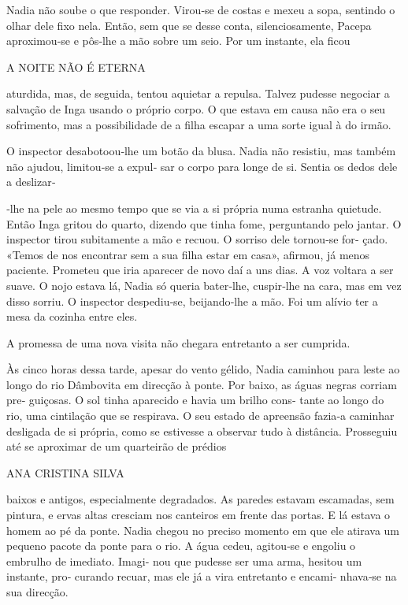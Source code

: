 Nadia não soube o que responder. Virou‑se de costas e mexeu a sopa,
sentindo o olhar dele fixo nela. Então, sem que se desse conta,
silenciosamente, Pacepa aproximou‑se e pôs‑lhe a mão sobre um seio. Por
um instante, ela ficou

A NOITE NÃO É ETERNA

aturdida, mas, de seguida, tentou aquietar a repulsa. Talvez pudesse
negociar a salvação de Inga usando o próprio corpo. O que estava em
causa não era o seu sofrimento, mas a possibilidade de a filha escapar a
uma sorte igual à do irmão.

O inspector desabotoou‑lhe um botão da blusa. Nadia não resistiu, mas
também não ajudou, limitou‑se a expul‑ sar o corpo para longe de si.
Sentia os dedos dele a deslizar‑

‑lhe na pele ao mesmo tempo que se via a si própria numa estranha
quietude. Então Inga gritou do quarto, dizendo que tinha fome,
perguntando pelo jantar. O inspector tirou subitamente a mão e recuou. O
sorriso dele tornou‑se for‑ çado. «Temos de nos encontrar sem a sua
filha estar em casa», afirmou, já menos paciente. Prometeu que iria
aparecer de novo daí a uns dias. A voz voltara a ser suave. O nojo
estava lá, Nadia só queria bater‑lhe, cuspir‑lhe na cara, mas em vez
disso sorriu. O inspector despediu‑se, beijando‑lhe a mão. Foi um alívio
ter a mesa da cozinha entre eles.

A promessa de uma nova visita não chegara entretanto a ser cumprida.

Às cinco horas dessa tarde, apesar do vento gélido, Nadia caminhou para
leste ao longo do rio Dâmbovita em direcção à ponte. Por baixo, as águas
negras corriam pre‑ guiçosas. O sol tinha aparecido e havia um brilho
cons‑ tante ao longo do rio, uma cintilação que se respirava. O seu
estado de apreensão fazia‑a caminhar desligada de si própria, como se
estivesse a observar tudo à distância. Prosseguiu até se aproximar de um
quarteirão de prédios

ANA CRISTINA SILVA

baixos e antigos, especialmente degradados. As paredes estavam
escamadas, sem pintura, e ervas altas cresciam nos canteiros em frente
das portas. E lá estava o homem ao pé da ponte. Nadia chegou no preciso
momento em que ele atirava um pequeno pacote da ponte para o rio. A água
cedeu, agitou‑se e engoliu o embrulho de imediato. Imagi‑ nou que
pudesse ser uma arma, hesitou um instante, pro‑ curando recuar, mas ele
já a vira entretanto e encami‑ nhava‑se na sua direcção.

